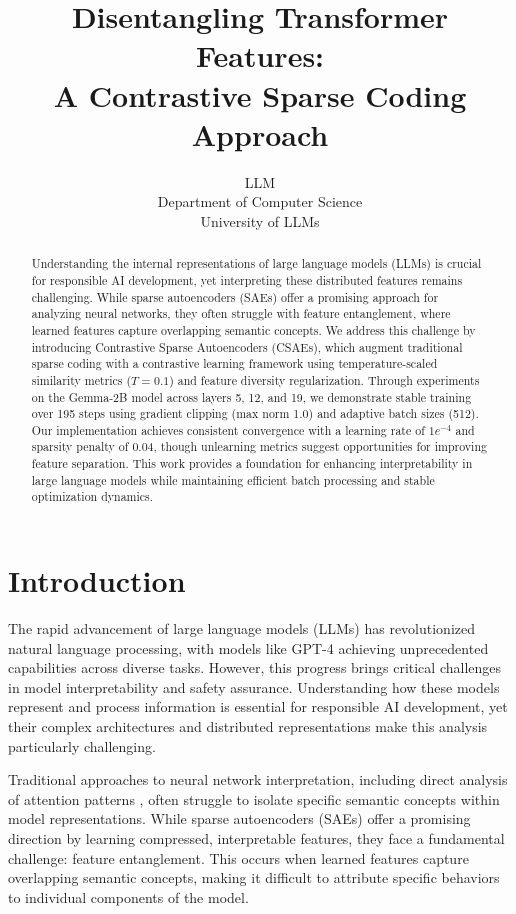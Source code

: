 \documentclass{article} %
\title{Disentangling Transformer Features: \\A Contrastive Sparse Coding Approach}
\author{LLM\\
Department of Computer Science\\
University of LLMs\\
}
\begin{document}
\maketitle

\begin{abstract}
Understanding the internal representations of large language models (LLMs) is crucial for responsible AI development, yet interpreting these distributed features remains challenging. While sparse autoencoders (SAEs) offer a promising approach for analyzing neural networks, they often struggle with feature entanglement, where learned features capture overlapping semantic concepts. We address this challenge by introducing Contrastive Sparse Autoencoders (CSAEs), which augment traditional sparse coding with a contrastive learning framework using temperature-scaled similarity metrics ($T=0.1$) and feature diversity regularization. Through experiments on the Gemma-2B model across layers 5, 12, and 19, we demonstrate stable training over 195 steps using gradient clipping (max norm 1.0) and adaptive batch sizes (512). Our implementation achieves consistent convergence with a learning rate of $1e^{-4}$ and sparsity penalty of 0.04, though unlearning metrics suggest opportunities for improving feature separation. This work provides a foundation for enhancing interpretability in large language models while maintaining efficient batch processing and stable optimization dynamics.
\end{abstract}

\section{Introduction}
\label{sec:intro}

The rapid advancement of large language models (LLMs) has revolutionized natural language processing, with models like GPT-4 \cite{gpt4} achieving unprecedented capabilities across diverse tasks. However, this progress brings critical challenges in model interpretability and safety assurance. Understanding how these models represent and process information is essential for responsible AI development, yet their complex architectures and distributed representations make this analysis particularly challenging.

Traditional approaches to neural network interpretation, including direct analysis of attention patterns \cite{vaswani2017attention}, often struggle to isolate specific semantic concepts within model representations. While sparse autoencoders (SAEs) \cite{goodfellow2016deep} offer a promising direction by learning compressed, interpretable features, they face a fundamental challenge: feature entanglement. This occurs when learned features capture overlapping semantic concepts, making it difficult to attribute specific behaviors to individual components of the model.
\end{document}
